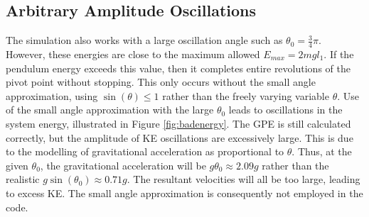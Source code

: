 \documentclass{article}
\begin{document}
\subsection{Arbitrary Amplitude Oscillations}
The simulation also works with a large oscillation angle such as $\theta_{0} = \frac{3}{4} \pi$. However, these energies are close to the maximum allowed $E_{max} = 2mgl_{1}$. If the pendulum energy exceeds this value, then it completes entire revolutions of the pivot point without stopping. This only occurs without the small angle approximation, using $\sin(\theta) \leq 1$ rather than the freely varying variable $\theta$. Use of the small angle approximation with the large $\theta_{0}$ leads to oscillations in the system energy, illustrated in Figure \ref{fig:badenergy}. The GPE is still calculated correctly, but the amplitude of KE oscillations are excessively large. This is due to the modelling of gravitational acceleration as proportional to $\theta$. Thus, at the given $\theta_{0}$, the gravitational acceleration will be $g\theta_{0} \approx 2.09g$ rather than the realistic $g\sin(\theta_{0}) \approx 0.71g$. The resultant velocities will all be too large, leading to excess KE. The small angle approximation is consequently not employed in the code.
\end{document}

